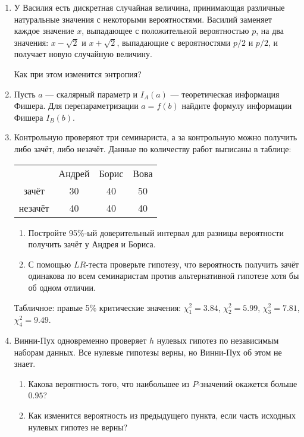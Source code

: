 \documentclass[12pt]{article}
\begin{document}

\begin{enumerate}

\item У Василия есть дискретная случайная величина, принимающая различные натуральные значения с некоторыми вероятностями. 
Василий заменяет каждое значение $x$, выпадающее с положительной вероятностью $p$, 
на два значения: $x-\sqrt{2}$ и $x+\sqrt{2}$, выпадающие с вероятностями $p/2$ и $p/2$, и получает новую случайную величину. 

Как при этом изменится энтропия?


\item Пусть $a$ — скалярный параметр и $I_A(a)$ — теоретическая информация Фишера.
Для  перепараметризации $a=f(b)$ найдите формулу информации Фишера $I_B(b)$.

\item Контрольную проверяют три семинариста, а за контрольную можно получить либо зачёт, либо незачёт. 
Данные по количеству работ выписаны в таблице:

\begin{tabular}{cccc}
& Андрей & Борис & Вова \\
зачёт & 30 & 40 & 50 \\
незачёт & 40 & 40 & 40 \\     
\end{tabular}

\begin{enumerate}
    \item Постройте 95\%-ый доверительный интервал для разницы вероятности получить зачёт у Андрея и Бориса. 
    \item С помощью $LR$-теста проверьте гипотезу, что вероятность получить зачёт одинакова по всем семинаристам 
    против альтернативной гипотезе хотя бы об одном отличии. 
\end{enumerate}

Табличное: правые 5\% критические значения: $\chi^2_1 = 3.84$, $\chi^2_2 = 5.99$, $\chi^2_3 = 7.81$, $\chi^2_4=9.49$.

\item Винни-Пух одновременно проверяет $h$ нулевых гипотез по независимым наборам данных. 
Все нулевые гипотезы верны, но Винни-Пух об этом не знает.

\begin{enumerate}
    \item Какова вероятность того, что наибольшее из $P$-значений окажется больше $0.95$?
    \item Как изменится вероятность из предыдущего пункта, если часть исходных нулевых гипотез не верны?
\end{enumerate}



\end{enumerate}
\end{document}
